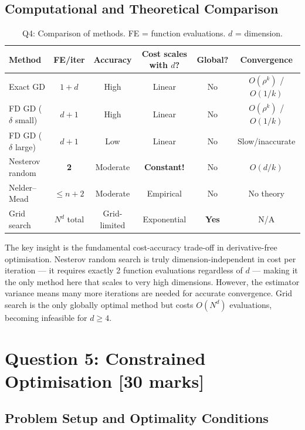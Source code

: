 \documentclass[11pt,a4paper]{article}
\theoremstyle{definition}
\begin{document}
\subsection{Computational and Theoretical Comparison}

\begin{table}[H]
\centering
\caption{Q4: Comparison of methods. FE = function evaluations. $d$ = dimension.}
\label{tab:q4_comparison}
\begin{tabular}{lccccc}
\toprule
\textbf{Method} & \textbf{FE/iter} & \textbf{Accuracy} & \textbf{Cost scales with $d$?} & \textbf{Global?} & \textbf{Convergence} \\
\midrule
Exact GD & $1+d$ & High & Linear & No & $O(\rho^k)$ / $O(1/k)$ \\
FD GD ($\delta$ small) & $d+1$ & High & Linear & No & $O(\rho^k)$ / $O(1/k)$ \\
FD GD ($\delta$ large) & $d+1$ & Low & Linear & No & Slow/inaccurate \\
Nesterov random & \textbf{2} & Moderate & \textbf{Constant!} & No & $O(d/k)$ \\
Nelder--Mead & $\leq n+2$ & Moderate & Empirical & No & No theory \\
Grid search & $N^d$ total & Grid-limited & Exponential & \textbf{Yes} & N/A \\
\bottomrule
\end{tabular}
\end{table}

The key insight is the fundamental cost-accuracy trade-off in derivative-free optimisation. Nesterov random search is truly dimension-independent in cost per iteration --- it requires exactly 2 function evaluations regardless of $d$ --- making it the only method here that scales to very high dimensions. However, the estimator variance means many more iterations are needed for accurate convergence. Grid search is the only globally optimal method but costs $O(N^d)$ evaluations, becoming infeasible for $d \geq 4$.

\section{Question 5: Constrained Optimisation \hfill [30 marks]}
\label{sec:q5}

\subsection{Problem Setup and Optimality Conditions}
\end{document}
